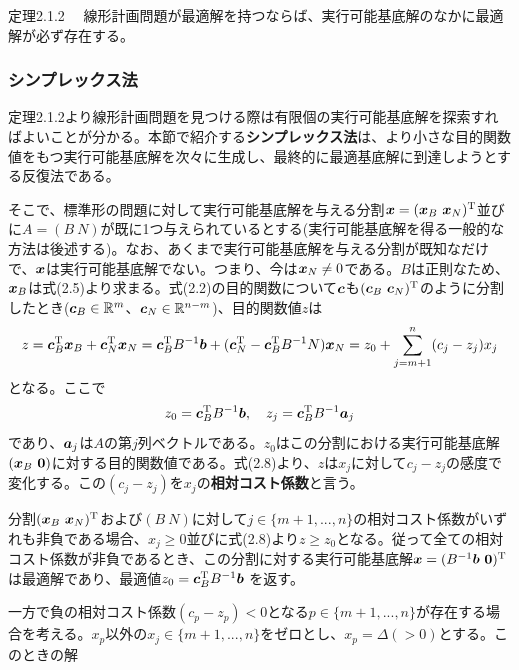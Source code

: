 \documentclass[dvipdfmx, 9pt, a4paper]{jsarticle}
\numberwithin{equation}{section}
\newcommand{\bm}[1]{{\mbox{\boldmath $#1$}}}
\begin{document}
\begin{itembox}[l]{定理2.1.2}
　線形計画問題が最適解を持つならば、実行可能基底解のなかに最適解が必ず存在する。
\end{itembox}

\subsubsection{シンプレックス法}
定理2.1.2より線形計画問題を見つける際は有限個の実行可能基底解を探索すればよいことが分かる。本節で紹介する{\bf シンプレックス法}は、より小さな目的関数値をもつ実行可能基底解を次々に生成し、最終的に最適基底解に到達しようとする反復法である。\par
そこで、標準形の問題に対して実行可能基底解を与える分割$\bm x=(\bm x_B~\bm x_N)^{\rm T}$並びに$A=(B~N)$が既に1つ与えられているとする(実行可能基底解を得る一般的な方法は後述する)。なお、あくまで実行可能基底解を与える分割が既知なだけで、$\bm x$は実行可能基底解でない。つまり、今は$\bm x_N \neq 0$である。$B$は正則なため、$\bm x_B$は式(2.5)より求まる。式(2.2)の目的関数について$\bm c$も$(\bm c_B~\bm c_N)^{\rm T}$のように分割したとき($\bm c_B \in \mathbb{R}^m$、$\bm c_N \in \mathbb{R}^{n-m}$)、目的関数値$z$は
\begin{equation}
z=\bm c_B^{\rm T}\bm x_B + \bm c_N^{\rm T}\bm x_N=\bm c_B^{\rm T}B^{-1}\bm b+(\bm c_N^{\rm T}-\bm c_B^{\rm T}B^{-1}N)\bm x_N=z_0+\sum_{j=m+1}^n(c_j-z_j)x_j
\end{equation}
となる。ここで
\begin{equation}
z_0=\bm c_B^{\rm T}B^{-1}\bm b,~~~z_j=\bm c_B^{\rm T}B^{-1}\bm a_j \notag
\end{equation}
であり、$\bm a_j$は$A$の第$j$列ベクトルである。$z_0$はこの分割における実行可能基底解$(\bm x_B~\bm 0)$に対する目的関数値である。式(2.8)より、$z$は$x_j$に対して$c_j-z_j$の感度で変化する。この$(c_j-z_j)$を$x_j$の{\bf 相対コスト係数}と言う。\par
分割$(\bm x_B~\bm x_N)^{\rm T}$および$(B~N)$に対して$j \in \{m+1,...,n\}$の相対コスト係数がいずれも非負である場合、$x_j \geq 0$並びに式(2.8)より$z \geq z_0$となる。従って全ての相対コスト係数が非負であるとき、この分割に対する実行可能基底解$\bm x=(B^{-1}\bm b~\bm 0)^{\rm T}$は最適解であり、最適値$z_0=\bm c_B^{\rm T}B^{-1}\bm b$	を返す。\par
一方で負の相対コスト係数$(c_p-z_p) < 0$となる$p \in \{m+1,...,n\}$が存在する場合を考える。$x_p$以外の$x_j \in \{m+1,...,n\}$をゼロとし、$x_p=\Delta(>0)$とする。このときの解
\end{document}
